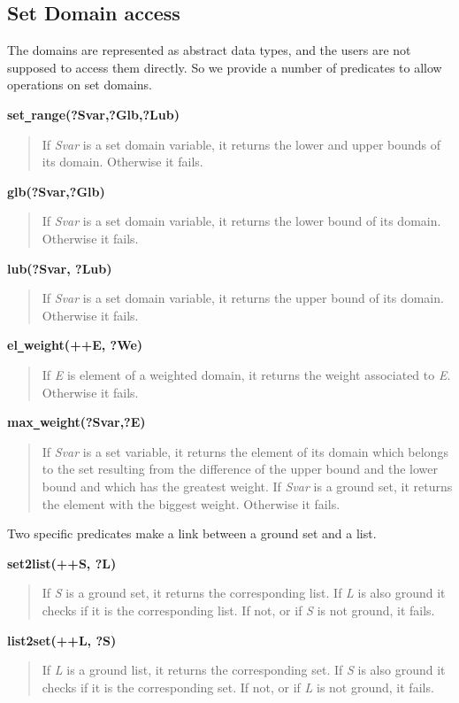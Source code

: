\subsection{Set Domain access}
The domains are represented as abstract data types, and the users are
not supposed to access them directly. So we provide a number of
predicates to allow operations on set domains.

\noindent
{}
{\bf set\verb/_/range(?Svar,?Glb,?Lub)} 
\begin{quote}
If {\em Svar} is a set domain variable, it returns the lower and upper
bounds of its domain.  Otherwise it fails.
\end{quote}
{\bf glb(?Svar,?Glb)} 
\begin{quote}
If {\em Svar} is a set domain variable, it returns the lower bound of
its domain. Otherwise it fails.
\end{quote}
{\bf lub(?Svar, ?Lub)}
\begin{quote}
If {\em Svar} is a set domain variable, it returns the upper bound of
its domain. Otherwise it fails.
\end{quote}
{\bf el\verb/_/weight(++E, ?We)}
\begin{quote}
If {\em E} is element of a weighted domain, it returns the weight
associated to {\em E}. Otherwise it fails.
\end{quote}
{\bf max\verb/_/weight(?Svar,?E)}
\begin{quote}
If {\em Svar} is a set variable, it returns the element of its domain
which belongs to the set resulting from the difference of the upper
bound and the lower bound and which has the greatest weight. If {\em
Svar} is a ground set, it returns the element with the biggest weight.
Otherwise it fails.
\end{quote}

\noindent
Two specific predicates make a link between a ground set and a list.

\noindent
{\bf set2list(++S, ?L)} 
\begin{quote}
If {\em S} is a ground set, it returns the corresponding list. If {\em
L} is also ground it checks if it is the corresponding list. If not,
or if {\em S} is not ground, it fails.
\end{quote}
{\bf list2set(++L, ?S)}
\begin{quote}
If {\em L} is a ground list, it returns the corresponding set. If {\em
S} is also ground it checks if it is the corresponding set. If not,
or if {\em L} is not ground, it fails.
\end{quote}

